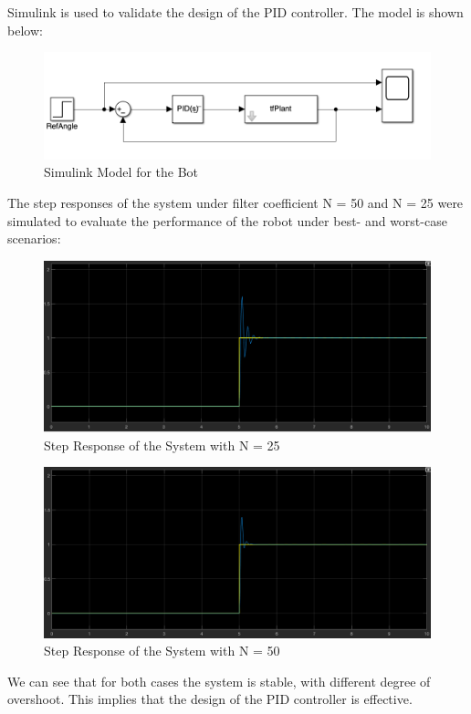 \documentclass{article}
\begin{document}
Simulink is used to validate the design of the PID controller. The model is
shown below:
\begin{figure}[H]
    \centerline{\includegraphics[width=\linewidth]{Figures/simModel.png}}
    \caption{Simulink Model for the Bot}
\end{figure}
The step responses of the system under filter coefficient N = 50 and N = 25 were
simulated to evaluate the performance of the robot under best- and worst-case
scenarios:
\begin{figure}[H]
    \centerline{\includegraphics[width=\linewidth]{Figures/step25.png}}
    \caption{Step Response of the System with N = 25}
\end{figure}
\begin{figure}[H]
    \centerline{\includegraphics[width=\linewidth]{Figures/step50.png}}
    \caption{Step Response of the System with N = 50}
\end{figure}
We can see that for both cases the system is stable, with different degree of
overshoot. This implies that the design of the PID controller is effective.
\end{document}
